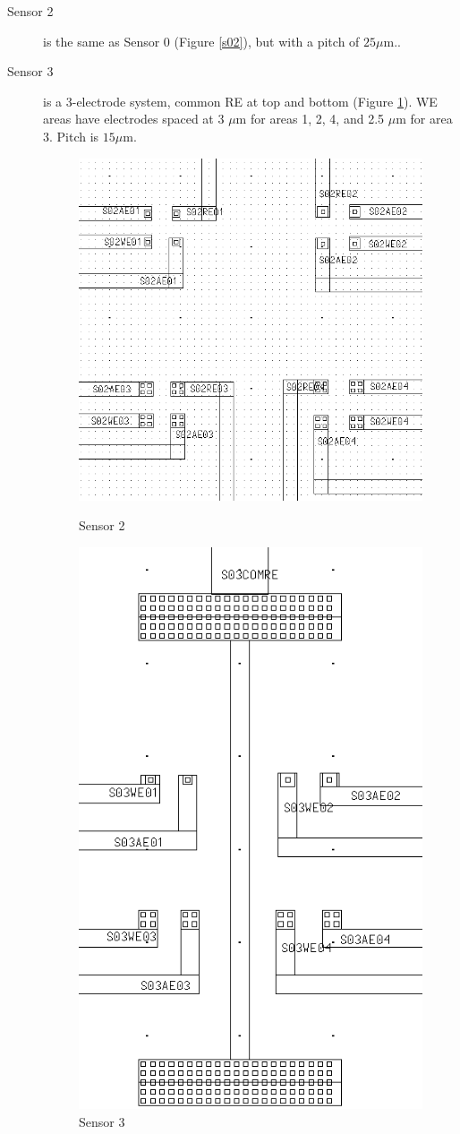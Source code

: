 \begin{description}
\item[Sensor 2] is the same as Sensor 0 (Figure \ref{s02}), but with a pitch of $25 \mu \mathrm{m}$..
\item[Sensor 3] is a 3-electrode system, common RE at top and bottom (Figure \ref{s03}). WE areas have electrodes spaced at 3 $\mu \mathrm{m}$ for areas 1, 2, 4, and 2.5 $\mu \mathrm{m}$ for area 3. Pitch is $15 \mu \mathrm{m}$.

\begin{figure}
	\begin{minipage}{0.5\linewidth}
		\centering
		\includegraphics[width=0.6\linewidth]{figures/s02.png}
		\caption{Sensor 2}
		\label{s02}
	\end{minipage}
	\begin{minipage}{0.5\linewidth}
		\centering
		\includegraphics[width=0.6\linewidth]{figures/s03.png}
		\caption{Sensor 3}
		\label{s03}
	\end{minipage}
\end{figure}


\end{description}
